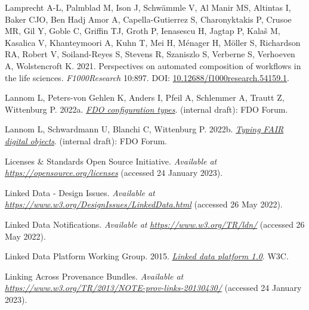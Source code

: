 \begin{CSLReferences}{1}{0}
\leavevmode{}%
Lamprecht A-L, Palmblad M, Ison J, Schwämmle V, Al Manir MS, Altintas I, Baker CJO, Ben Hadj Amor A, Capella-Gutierrez S, Charonyktakis P, Crusoe MR, Gil Y, Goble C, Griffin TJ, Groth P, Ienasescu H, Jagtap P, Kalaš M, Kasalica V, Khanteymoori A, Kuhn T, Mei H, Ménager H, Möller S, Richardson RA, Robert V, Soiland-Reyes S, Stevens R, Szaniszlo S, Verberne S, Verhoeven A, Wolstencroft K. 2021. Perspectives on automated composition of workflows in the life sciences. \emph{F1000Research} 10:897. DOI: \href{https://doi.org/10.12688/f1000research.54159.1}{10.12688/f1000research.54159.1}.

\leavevmode{}%
Lannom L, Peters-von Gehlen K, Anders I, Pfeil A, Schlemmer A, Trautt Z, Wittenburg P. 2022a. \emph{\href{https://docs.google.com/document/d/1ivvg3C_QWSO9PIQwkKT89xG4fBhNAs7_6b0Dz11EwDg/edit}{FDO configuration types}}. (internal draft): FDO Forum.

\leavevmode{}%
Lannom L, Schwardmann U, Blanchi C, Wittenburg P. 2022b. \emph{\href{https://docs.google.com/document/d/1X0hcOVIqP7iYIJf9u-7x3RwcXK8ecsauy0FZg_6-Bg0/edit}{Typing FAIR digital objects}}. (internal draft): FDO Forum.

\leavevmode{}%
Licenses \& Standards \textbar{} Open Source Initiative. \emph{Available at} \href{https://opensource.org/licenses}{\emph{https://opensource.org/licenses}} (accessed 24 January 2023).

\leavevmode{}%
Linked Data - Design Issues. \emph{Available at} \href{https://www.w3.org/DesignIssues/LinkedData.html}{\emph{https://www.w3.org/DesignIssues/LinkedData.html}} (accessed 26 May 2022).

\leavevmode{}%
Linked Data Notifications. \emph{Available at} \href{https://www.w3.org/TR/ldn/}{\emph{https://www.w3.org/TR/ldn/}} (accessed 26 May 2022).

\leavevmode{}%
Linked Data Platform Working Group. 2015. \emph{\href{https://www.w3.org/TR/2015/REC-ldp-20150226/}{Linked data platform 1.0}}. W3C.

\leavevmode{}%
Linking Across Provenance Bundles. \emph{Available at} \href{https://www.w3.org/TR/2013/NOTE-prov-links-20130430/}{\emph{https://www.w3.org/TR/2013/NOTE-prov-links-20130430/}} (accessed 24 January 2023).


\end{CSLReferences}
